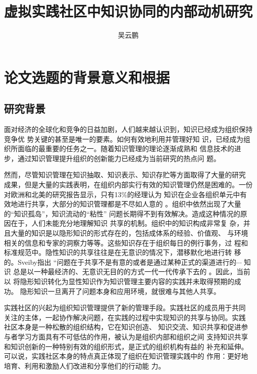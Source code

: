 \documentclass[12pt,a4paper,cs4size]{ctexart}
\begin{document}
  \title{虚拟实践社区中知识协同的内部动机研究 }
  \author {吴云鹏}

 \newpage
  \tableofcontents



\newpage
  \section{论文选题的背景意义和根据}

  \subsection{研究背景}

  
面对经济的全球化和竞争的日益加剧，人们越来越认识到，知识已经成为组织保持竞争优
势关键的甚至是唯一的要素\cite{Drucker1995}。如何有效地利用并管理好知
识，已经成为组织所面临的最重要的任务之一。随着知识管理的理论逐渐成熟和
信息技术的进步，通过知识管理提升组织的创新能力已经成为当前研究的热点问
题。

然而，尽管知识管理在知识抽取、知识表示、知识存贮等方面取得了大量的研究
成果，但是大量的实践表明，在组织内部实行有效的知识管理仍然是困难的。一份对欧洲和北美的研究报告显示，只有13\%的经理认为
知识在企业各组织单元中有效地进行共享，大部分的知识管理都是不尽如人意的
\cite{Ruggles1998}。组织中依然出现了大量的“知识孤岛”，知识流动的“粘性”\cite{szulanski2000pkt}
问题长期得不到有效解决。造成这种情况的原因在于，人们未能充分地理解知识
共享的机制。组织中的知识构成非常复
杂，并且大量的知识是以隐形知识的形式存在的，包括成体系的经验、价值观、
与环境相关的信息和专家的洞察力等等。这些知识存在于组织每日的例行事务，过
程和标准规范中。隐性知识的共享往往是在无意识的情况下，潜移默化地进行转
移的。Sveiby指出
“问题在于共享不是有意的或者是通过某种正式的渠道进行的$\cdots$ 知识
总是以一种最经济的、无意识无目的的方式一代一代传承下去的
\cite{sveiby1996tka}。因此，当前以
将隐形知识转化为显性知识作为知识管理主要内容的实践并未取得预期的成功。
隐形知识一旦离开了问题本身和应用环境，就很难与其他人共享。

实践社区的兴起为组织知识管理提供了新的管理手段。实践社区的成员用于共同
关注的主体，一起协作解决问题，在实践的过程中实现知识的共享与协同。实践
社区本身是一种松散的组织结构，它在知识创造、
知识交流、知识共享和促进参与者学习方面具有不可低估的作用，被认为是组织内部和组织之间
支持知识共享和知识创新的一种特别有效的组织形式，是正式的组织机构有益的
补充和延伸。可以说，实践社区本身的特点真正体现了组织在知识管理实践中的
作用：更好地培育、利用和激励人们改进和分享他们的行动能
力\cite{Seviby1997}。
\end{document}
